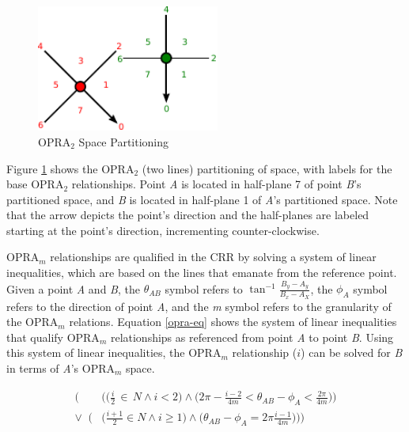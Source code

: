 \documentclass[12pt]{ucthesis}
\begin{document}
\begin{figure}[H]
\centering
\includegraphics[width=60mm]{facing-opra-base-rel}
\caption{OPRA$_{2}$ Space Partitioning}
\label{facing-opra-base-rel}
\end{figure}

Figure \ref{facing-opra-base-rel} shows the OPRA$_{2}$ (two lines) partitioning of space, with labels for the base OPRA$_{2}$ relationships. Point \emph{A} is located in half-plane 7 of point \emph{B}'s partitioned space, and \emph{B} is located in half-plane 1 of \emph{A}'s partitioned space. Note that the arrow depicts the point's direction and the half-planes are labeled starting at the point's direction, incrementing counter-clockwise. 

OPRA$_{m}$ relationships are qualified in the CRR by solving a system of linear inequalities, which are based on the lines that emanate from the reference point. Given a point \emph{A} and \emph{B}, the $\theta_{AB}$ symbol refers to $ \tan^{-1} \frac{B_{y} - A_{y}}{B_{x} - A_{X}} $, the $\phi_{A}$ symbol refers to the direction of point \emph{A}, and the \emph{m} symbol refers to the granularity of the OPRA$_{m}$ relations. Equation \ref{opra-eq} shows the system of linear inequalities that qualify OPRA$_{m}$ relationships as referenced from point \emph{A} to point \emph{B}. Using this system of linear inequalities, the OPRA$_{m}$ relationship ($i$) can be solved for \emph{B} in terms of \emph{A}'s OPRA$_{m}$ space.

\begin{equation}\label{opra-eq}
\begin{aligned}
\Big(&\Big(\Big(\frac{i}{2} \, \in \, N \wedge i < 2\Big) \wedge \Big(2\pi - \frac{i-2}{4m} < \theta_{AB} - \phi_{A} < \frac{2\pi}{4m}\Big)\Big) \\
\lor \;\; \Big(&\Big(\frac{i+1}{2} \in N \wedge i \geq 1\Big) \wedge \Big(\theta_{AB} - \phi_{A} = 2\pi \frac{i-1}{4m}\Big)\Big)\Big) \\ \\
\end{aligned}
\end{equation}
\end{document}
